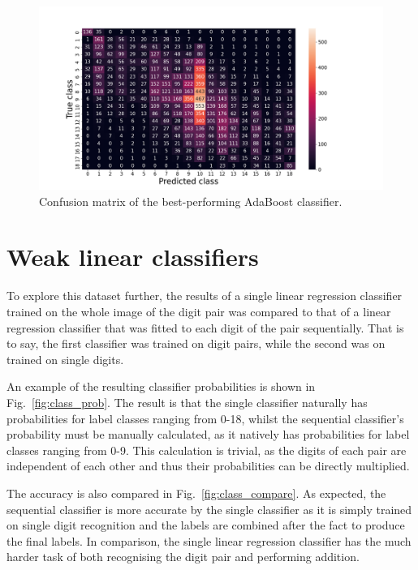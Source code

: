 \documentclass[11pt,a4paper]{article}
\begin{document}
\begin{figure}[htb]
    \centering
    \includegraphics[width=\columnwidth, keepaspectratio]{../confusion_AdaBoost Classifier.png}
    \caption{Confusion matrix of the best-performing AdaBoost classifier.}\label{fig:ab_confusion}
\end{figure}

\section{Weak linear classifiers}
To explore this dataset further, the results of a single linear regression classifier trained on the whole image of the digit pair was compared to that of a linear regression classifier that was fitted to each digit of the pair sequentially. That is to say, the first classifier was trained on digit pairs, while the second was on trained on single digits.

An example of the resulting classifier probabilities is shown in Fig.~\ref{fig:class_prob}. The result is that the single classifier naturally has probabilities for label classes ranging from 0-18, whilst the sequential classifier's probability must be manually calculated, as it natively has probabilities for label classes ranging from 0-9. This calculation is trivial, as the digits of each pair are independent of each other and thus their probabilities can be directly multiplied.

The accuracy is also compared in Fig.~\ref{fig:class_compare}. As expected, the sequential classifier is more accurate by the single classifier as it is simply trained on single digit recognition and the labels are combined after the fact to produce the final labels. In comparison, the single linear regression classifier has the much harder task of both recognising the digit pair and performing addition.
\end{document}
